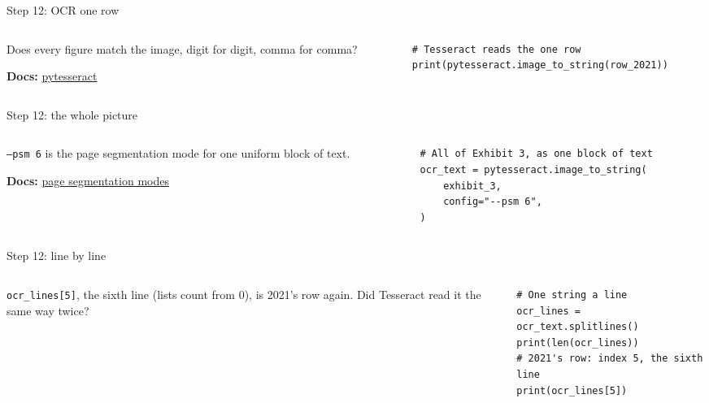 \documentclass[9pt,aspectratio=169]{beamer}
\begin{document}
\begin{frame}[fragile]{Step 12: OCR one row}
    \begin{columns}[T]
        \begin{column}{0.37\textwidth}
            Does every figure match the image, digit for digit, comma for comma?

            \medskip
            {\scriptsize\textbf{Docs:} \href{https://github.com/madmaze/pytesseract\#usage}{pytesseract}\par}
        \end{column}
        \begin{column}{0.6\textwidth}
\begin{lstlisting}
# Tesseract reads the one row
print(pytesseract.image_to_string(row_2021))
\end{lstlisting}
        \end{column}
    \end{columns}
\end{frame}

\begin{frame}[fragile]{Step 12: the whole picture}
    \begin{columns}[T]
        \begin{column}{0.37\textwidth}
            \texttt{--psm 6} is the page segmentation mode for one uniform block of text.

            \medskip
            {\scriptsize\textbf{Docs:} \href{https://tesseract-ocr.github.io/tessdoc/ImproveQuality.html\#page-segmentation-method}{page segmentation modes}\par}
        \end{column}
        \begin{column}{0.6\textwidth}
\begin{lstlisting}
# All of Exhibit 3, as one block of text
ocr_text = pytesseract.image_to_string(
    exhibit_3,
    config="--psm 6",
)
\end{lstlisting}
        \end{column}
    \end{columns}
\end{frame}

\begin{frame}[fragile]{Step 12: line by line}
    \begin{columns}[T]
        \begin{column}{0.37\textwidth}
            \texttt{ocr\_lines[5]}, the sixth line (lists count from 0), is 2021's row again. Did Tesseract read it the same way twice?
        \end{column}
        \begin{column}{0.6\textwidth}
\begin{lstlisting}
# One string a line
ocr_lines = ocr_text.splitlines()
print(len(ocr_lines))
# 2021's row: index 5, the sixth line
print(ocr_lines[5])
\end{lstlisting}
        \end{column}
    \end{columns}
\end{frame}
\end{document}
